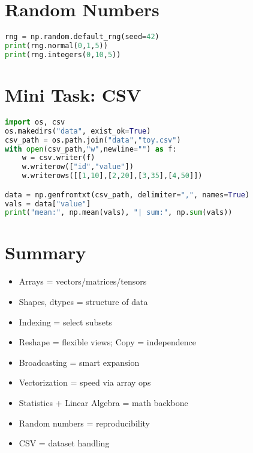 \section{Random Numbers}
\begin{lstlisting}[language=Python]
rng = np.random.default_rng(seed=42)
print(rng.normal(0,1,5))
print(rng.integers(0,10,5))
\end{lstlisting}

\section{Mini Task: CSV}
\begin{lstlisting}[language=Python]
import os, csv
os.makedirs("data", exist_ok=True)
csv_path = os.path.join("data","toy.csv")
with open(csv_path,"w",newline="") as f:
    w = csv.writer(f)
    w.writerow(["id","value"])
    w.writerows([[1,10],[2,20],[3,35],[4,50]])

data = np.genfromtxt(csv_path, delimiter=",", names=True)
vals = data["value"]
print("mean:", np.mean(vals), "| sum:", np.sum(vals))
\end{lstlisting}

\section*{Summary}
\begin{itemize}
  \item Arrays = vectors/matrices/tensors
  \item Shapes, dtypes = structure of data
  \item Indexing = select subsets
  \item Reshape = flexible views; Copy = independence
  \item Broadcasting = smart expansion
  \item Vectorization = speed via array ops
  \item Statistics + Linear Algebra = math backbone
  \item Random numbers = reproducibility
  \item CSV = dataset handling
\end{itemize}
